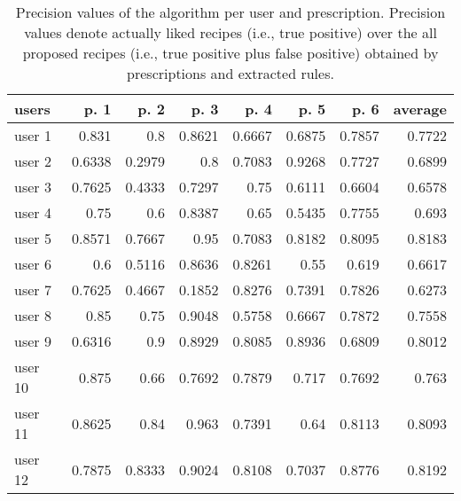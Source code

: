 \begin{table}%
    \centering
    \caption{
        Precision values of the algorithm per user and prescription. Precision values denote actually liked recipes (i.e., true positive) over the all proposed recipes (i.e., true positive plus false positive) obtained by prescriptions and extracted rules.
    }
        \begin{tabular}{l||r|r|r|r|r|r||r}
            \textbf{users} & \textbf{p. 1} & \textbf{p. 2} & \textbf{p. 3} & \textbf{p. 4} & \textbf{p. 5} & \textbf{p. 6} & \textbf{average}\\
            \hline\hline
            user 1 & 0.831 & 0.8 & 0.8621 & 0.6667 & 0.6875 & 0.7857 & 0.7722\\
            user 2 & 0.6338 & 0.2979 & 0.8 & 0.7083 & 0.9268 & 0.7727 & 0.6899\\
            user 3 & 0.7625 & 0.4333 & 0.7297 & 0.75 & 0.6111 & 0.6604 & 0.6578\\
            user 4 & 0.75 & 0.6 & 0.8387 & 0.65 & 0.5435 & 0.7755 & 0.693\\
            user 5 & 0.8571 & 0.7667 & 0.95 & 0.7083 & 0.8182 & 0.8095 & 0.8183\\
            user 6 & 0.6 & 0.5116 & 0.8636 & 0.8261 & 0.55 & 0.619 & 0.6617\\
            user 7 & 0.7625 & 0.4667 & 0.1852 & 0.8276 & 0.7391 & 0.7826 & 0.6273\\
            user 8 & 0.85 & 0.75 & 0.9048 & 0.5758 & 0.6667 & 0.7872 & 0.7558\\
            user 9 & 0.6316 & 0.9 & 0.8929 & 0.8085 & 0.8936 & 0.6809 & 0.8012\\
            user 10 & 0.875 & 0.66 & 0.7692 & 0.7879 & 0.717 & 0.7692 & 0.763\\
            user 11 & 0.8625 & 0.84 & 0.963 & 0.7391 & 0.64 & 0.8113 & 0.8093\\
            user 12 & 0.7875 & 0.8333 & 0.9024 & 0.8108 & 0.7037 & 0.8776 & 0.8192\\
        \end{tabular}
    \label{tab:proposed-recipes-stats}
\end{table}

